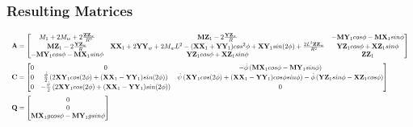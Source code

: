 \documentclass[a4paper,10pt]{article}
\newcommand\scalemath[2]{\scalebox{#1}{\mbox{\ensuremath{\displaystyle #2}}}}
\begin{document}
\subsubsection{Resulting Matrices}
\begin{align} \begin{split}
 &\scalemath{0.595}{\mathbf{A} = \left[ \begin{matrix} M_1+2M_w+2\frac{\mathbf{ZZ}_w}{R^2} & \mathbf{MZ}_1-2\frac{\mathbf{YZ}_w}{R} & -\mathbf{MY}_1cos\phi-\mathbf{MX}_1sin\phi \\ 
   \mathbf{MZ}_1-2\frac{\mathbf{YZ}_w}{R} & \mathbf{XX}_1+2\mathbf{YY}_w+2M_wL^2-(\mathbf{XX}_1+\mathbf{YY}_1)cos^2\phi+\mathbf{XY}_1sin(2\phi)+\frac{2L^2\mathbf{ZZ}_w}{R^2} & \mathbf{YZ}_1cos\phi+\mathbf{XZ}_1sin\phi \\
   -\mathbf{MY}_1cos\phi-\mathbf{MX}_1sin\phi & \mathbf{YZ}_1cos\phi+\mathbf{XZ}_1sin\phi  & \mathbf{ZZ}_1 \end{matrix} \right]} \\
  &\scalemath{0.595}{\mathbf{C} = \left[ \begin{matrix} 0 & 0 & -\dot{\phi}\left(\mathbf{MX}_1cos\phi-\mathbf{MY}_1sin\phi\right) \\ 
    0 & \frac{\dot{\phi}}{2}\left(2\mathbf{XY}_1cos(2\phi)+(\mathbf{XX}_1-\mathbf{YY}_1)sin(2\phi)\right) & \dot\psi\left(\mathbf{XY}_1cos(2\phi)+(\mathbf{XX}_1-\mathbf{YY}_1)cos\phi sin\phi\right)-\dot\phi\left(\mathbf{YZ}_1sin\phi-\mathbf{XZ}_1cos\phi\right) \\ 
    0 & -\frac{\dot{\psi}}{2}\left(2\mathbf{XY}_1cos(2\phi)+(\mathbf{XX}_1-\mathbf{YY}_1)sin(2\phi)\right) & 0 \end{matrix} \right]} \\
 &\scalemath{0.595}{\mathbf{Q} = \left[ \begin{matrix} 0 \\ 0 \\ \mathbf{MX}_1gcos\phi - \mathbf{MY}_1gsin\phi \end{matrix} \right]}
\end{split} \end{align}
\end{document}
